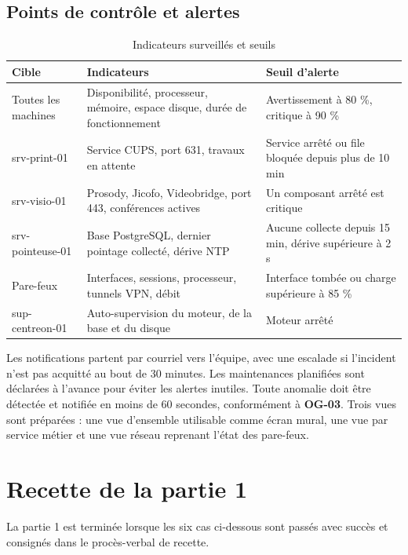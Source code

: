 \documentclass[11pt,a4paper]{article}
\newcommand{\rid}[1]{\textcolor{primary}{\textbf{\small #1}}}
\begin{document}
\subsection{Points de contrôle et alertes}
\begin{table}[H]
\centering
\caption{Indicateurs surveillés et seuils}
\begin{tabularx}{\textwidth}{L{3.4cm} Y L{4.5cm}}
\toprule
{}\textbf{Cible} & \textbf{Indicateurs} & \textbf{Seuil d'alerte} \\
\midrule
Toutes les machines & Disponibilité, processeur, mémoire, espace disque, durée de fonctionnement & Avertissement à 80 \%, critique à 90 \% \\
\ttfamily srv-print-01 & Service CUPS, port 631, travaux en attente & Service arrêté ou file bloquée depuis plus de 10 min \\
\ttfamily srv-visio-01 & Prosody, Jicofo, Videobridge, port 443, conférences actives & Un composant arrêté est critique \\
\ttfamily srv-pointeuse-01 & Base PostgreSQL, dernier pointage collecté, dérive NTP & Aucune collecte depuis 15 min, dérive supérieure à 2 s \\
Pare-feux & Interfaces, sessions, processeur, tunnels VPN, débit & Interface tombée ou charge supérieure à 85 \% \\
\ttfamily sup-centreon-01 & Auto-supervision du moteur, de la base et du disque & Moteur arrêté \\
\bottomrule
\end{tabularx}
\end{table}

Les notifications partent par courriel vers l'équipe, avec une escalade si l'incident n'est pas acquitté au bout de 30 minutes. Les maintenances planifiées sont déclarées à l'avance pour éviter les alertes inutiles. Toute anomalie doit être détectée et notifiée en moins de 60 secondes, conformément à \rid{OG-03}. Trois vues sont préparées : une vue d'ensemble utilisable comme écran mural, une vue par service métier et une vue réseau reprenant l'état des pare-feux.

\section{Recette de la partie 1}
La partie 1 est terminée lorsque les six cas ci-dessous sont passés avec succès et consignés dans le procès-verbal de recette.
\end{document}
